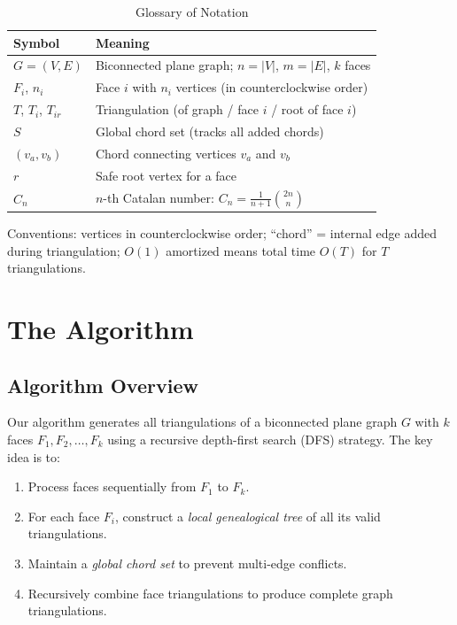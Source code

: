 \documentclass[12pt,a4paper]{article}
\theoremstyle{definition}
\theoremstyle{remark}
\begin{document}
\begin{table}[H]
\centering
\caption{Glossary of Notation}
\begin{tabular}{|l|p{10cm}|}
\hline
\textbf{Symbol} & \textbf{Meaning} \\
\hline
$G = (V, E)$ & Biconnected plane graph; $n = |V|$, $m = |E|$, $k$ faces \\
$F_i$, $n_i$ & Face $i$ with $n_i$ vertices (in counterclockwise order) \\
$T$, $T_i$, $T_{ir}$ & Triangulation (of graph / face $i$ / root of face $i$) \\
$S$ & Global chord set (tracks all added chords) \\
$(v_a, v_b)$ & Chord connecting vertices $v_a$ and $v_b$ \\
$r$ & Safe root vertex for a face \\
$C_n$ & $n$-th Catalan number: $C_n = \frac{1}{n+1}\binom{2n}{n}$ \\
\hline
\end{tabular}
\label{tab:notation}
\end{table}

Conventions: vertices in counterclockwise order; ``chord'' = internal edge added during triangulation; $O(1)$ amortized means total time $O(T)$ for $T$ triangulations.


\section{The Algorithm}
\label{sec:algorithm}

\subsection{Algorithm Overview}

Our algorithm generates all triangulations of a biconnected plane graph $G$ with $k$ faces $F_1, F_2, \ldots, F_k$ using a recursive depth-first search (DFS) strategy. The key idea is to:

\begin{enumerate}
    \item Process faces sequentially from $F_1$ to $F_k$.
    \item For each face $F_i$, construct a \emph{local genealogical tree} of all its valid triangulations.
    \item Maintain a \emph{global chord set} to prevent multi-edge conflicts.
    \item Recursively combine face triangulations to produce complete graph triangulations.
\end{enumerate}
\end{document}
